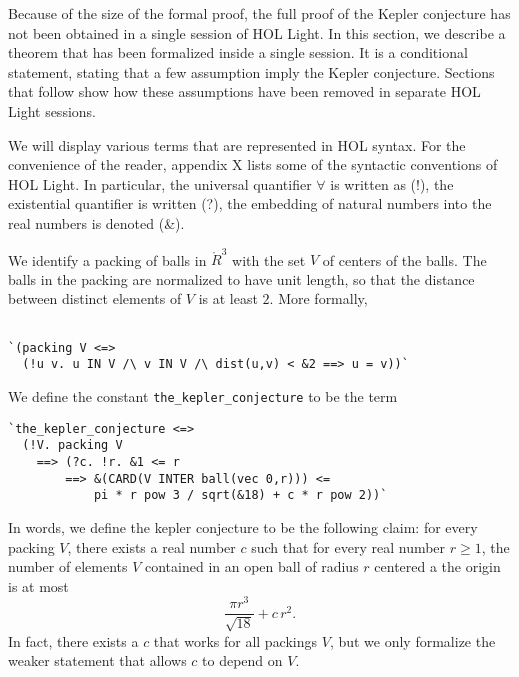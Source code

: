 Because of the size of the formal proof, the full proof of the Kepler conjecture has not been obtained in a single session
of HOL Light.  In this section, we describe a theorem that has been formalized inside a single session.  It is a conditional
statement, stating that a few assumption imply the Kepler conjecture.  Sections that follow show how these assumptions
have been removed in separate HOL Light sessions.

We will display various terms that are represented in HOL syntax.  For the convenience of the reader, appendix X lists
some of the syntactic conventions of HOL Light.  In particular, the universal quantifier $\forall$ is written as (!), the
existential quantifier is written (?),  the embedding of natural numbers into the real numbers is denoted (\&).

We identify a packing of balls in $\ring{R}^3$ with the set $V$ of centers of the balls.  The balls in the packing are normalized
to have unit length, so that the distance between distinct elements of $V$ is at least $2$.  More formally,

\begin{obeylines}

\begin{verbatim}

`(packing V <=> 
  (!u v. u IN V /\ v IN V /\ dist(u,v) < &2 ==> u = v))`

\end{verbatim}
\end{obeylines}


We define the constant {\tt the\_kepler\_conjecture} to be the term

\begin{obeylines}

\begin{verbatim}
`the_kepler_conjecture <=>
  (!V. packing V
    ==> (?c. !r. &1 <= r
        ==> &(CARD(V INTER ball(vec 0,r))) <=
            pi * r pow 3 / sqrt(&18) + c * r pow 2))`
\end{verbatim}
\end{obeylines}

In words, we define the kepler conjecture to be the following claim:
for every packing $V$, there exists a real number $c$ such that for every real number $r\ge 1$, the number
of elements $V$ contained in an open ball of radius $r$ centered a the origin is at most
\[
  \frac{\pi r^3}{\sqrt{18}} + c\, r^2.
\]
In fact, there exists a $c$ that works for all packings $V$,
but we only formalize the weaker statement that allows $c$ to depend on $V$.

